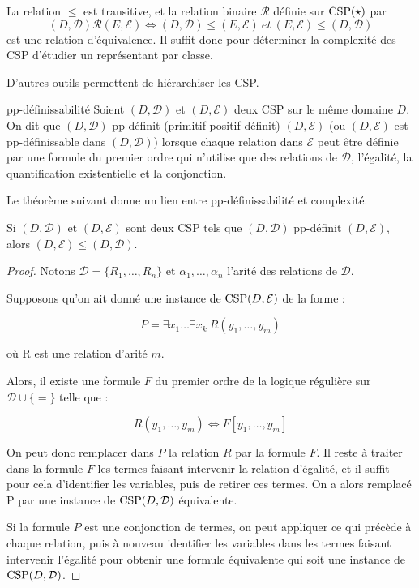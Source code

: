 \begin{prop}
    La relation $\leq$ est transitive, et la relation binaire $\mathcal{R}$ définie
    sur $\text{CSP} (\star)$ par $$(D,\mathcal{D}) \mathcal{R} (E,\mathcal{E}) \iff
    (D,\mathcal{D}) \leq (E,\mathcal{E}) \ et \ (E,\mathcal{E}) \leq
    (D,\mathcal{D})$$ est une relation d'équivalence. Il suffit donc pour
    déterminer la complexité des CSP d'étudier un représentant par classe.
\end{prop}

D'autres outils permettent de hiérarchiser les CSP.

\begin{defi}{pp-définissabilité}
    Soient $(D,\mathcal{D})$ et $(D,\mathcal{E})$ deux CSP sur le même domaine $D$.
    On dit que $(D,\mathcal{D})$ pp-définit (primitif-positif définit)
    $(D,\mathcal{E})$ (ou $(D,\mathcal{E})$ est pp-définissable dans
    $(D,\mathcal{D})$) lorsque chaque relation dans $\mathcal{E}$ peut être
    définie par une formule du premier ordre qui n'utilise que des relations de
    $\mathcal{D}$, l'égalité, la quantification existentielle et la
    conjonction.
\end{defi}

Le théorème suivant donne un lien entre pp-définissabilité et complexité.

\begin{theo}{}
    Si  $(D,\mathcal{D})$ et $(D,\mathcal{E})$ sont deux CSP tels que
    $(D,\mathcal{D})$ pp-définit $(D,\mathcal{E})$, alors $(D,\mathcal{E}) \leq
    (D,\mathcal{D})$.
\end{theo}

\begin{proof}
    Notons $\mathcal{D} = \{R_1,\dots,R_n\}$ et $\alpha_1,\dots,\alpha_n$ l'arité
    des relations de $\mathcal{D}$. 

    Supposons qu'on ait donné une instance de $\text{CSP} (D,\mathcal{E})$ de la forme :

    $$P = \exists x_1 \dots \exists x_k \ R(y_1,\dots,y_m)$$

    où R est une relation d'arité $m$.

    Alors, il existe une formule $F$ du premier ordre de la logique régulière sur
    $\mathcal{D} \cup \{=\}$ telle que :

    $$ R(y_1,\dots,y_m) \iff F[y_1,\dots,y_m]$$

    On peut donc remplacer dans $P$ la relation $R$ par la formule $F$. Il reste à
    traiter dans la formule $F$ les termes faisant intervenir la relation
    d'égalité, et il suffit pour cela d'identifier les variables, puis de
    retirer ces termes. On a alors remplacé P par une instance de $\text{CSP}
    (D,\mathcal{D})$ équivalente.

    Si la formule $P$ est une conjonction de termes, on peut appliquer ce qui
    précède à chaque relation, puis à nouveau identifier les variables dans les
    termes faisant intervenir l'égalité pour obtenir une formule équivalente
    qui soit une instance de $\text{CSP} (D,\mathcal{D})$. 
\end{proof}

